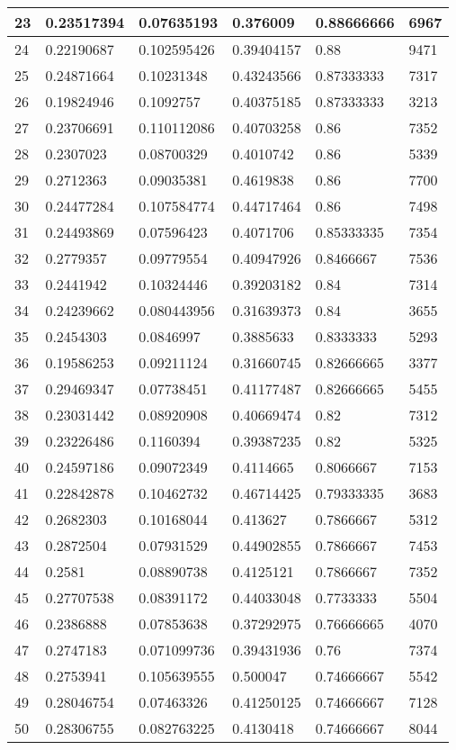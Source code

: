 \begin{longtable}{|l|l|l|l|l|l|}
23 & 0.23517394 & 0.07635193 & 0.376009 & 0.88666666 & 6967 \\ \hline 
24 & 0.22190687 & 0.102595426 & 0.39404157 & 0.88 & 9471 \\ \hline 
25 & 0.24871664 & 0.10231348 & 0.43243566 & 0.87333333 & 7317 \\ \hline 
26 & 0.19824946 & 0.1092757 & 0.40375185 & 0.87333333 & 3213 \\ \hline 
27 & 0.23706691 & 0.110112086 & 0.40703258 & 0.86 & 7352 \\ \hline 
28 & 0.2307023 & 0.08700329 & 0.4010742 & 0.86 & 5339 \\ \hline 
29 & 0.2712363 & 0.09035381 & 0.4619838 & 0.86 & 7700 \\ \hline 
30 & 0.24477284 & 0.107584774 & 0.44717464 & 0.86 & 7498 \\ \hline 
31 & 0.24493869 & 0.07596423 & 0.4071706 & 0.85333335 & 7354 \\ \hline 
32 & 0.2779357 & 0.09779554 & 0.40947926 & 0.8466667 & 7536 \\ \hline 
33 & 0.2441942 & 0.10324446 & 0.39203182 & 0.84 & 7314 \\ \hline 
34 & 0.24239662 & 0.080443956 & 0.31639373 & 0.84 & 3655 \\ \hline 
35 & 0.2454303 & 0.0846997 & 0.3885633 & 0.8333333 & 5293 \\ \hline 
36 & 0.19586253 & 0.09211124 & 0.31660745 & 0.82666665 & 3377 \\ \hline 
37 & 0.29469347 & 0.07738451 & 0.41177487 & 0.82666665 & 5455 \\ \hline 
38 & 0.23031442 & 0.08920908 & 0.40669474 & 0.82 & 7312 \\ \hline 
39 & 0.23226486 & 0.1160394 & 0.39387235 & 0.82 & 5325 \\ \hline 
40 & 0.24597186 & 0.09072349 & 0.4114665 & 0.8066667 & 7153 \\ \hline 
41 & 0.22842878 & 0.10462732 & 0.46714425 & 0.79333335 & 3683 \\ \hline 
42 & 0.2682303 & 0.10168044 & 0.413627 & 0.7866667 & 5312 \\ \hline 
43 & 0.2872504 & 0.07931529 & 0.44902855 & 0.7866667 & 7453 \\ \hline 
44 & 0.2581 & 0.08890738 & 0.4125121 & 0.7866667 & 7352 \\ \hline 
45 & 0.27707538 & 0.08391172 & 0.44033048 & 0.7733333 & 5504 \\ \hline 
46 & 0.2386888 & 0.07853638 & 0.37292975 & 0.76666665 & 4070 \\ \hline 
47 & 0.2747183 & 0.071099736 & 0.39431936 & 0.76 & 7374 \\ \hline 
48 & 0.2753941 & 0.105639555 & 0.500047 & 0.74666667 & 5542 \\ \hline 
49 & 0.28046754 & 0.07463326 & 0.41250125 & 0.74666667 & 7128 \\ \hline 
50 & 0.28306755 & 0.082763225 & 0.4130418 & 0.74666667 & 8044 \\ \hline 
\end{longtable}